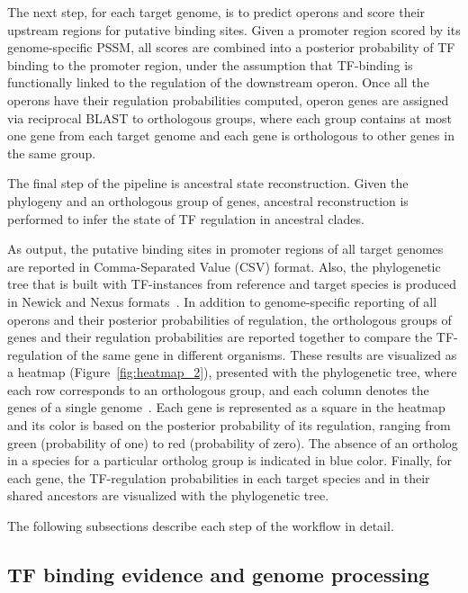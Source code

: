 The next step, for each target genome, is to predict operons and score their
upstream regions for putative binding sites. Given a promoter region scored by
its genome-specific PSSM, all scores are combined into a posterior probability
of TF binding to the promoter region, under the assumption that TF-binding is
functionally linked to the regulation of the downstream operon. Once all the
operons have their regulation probabilities computed, operon genes are assigned
via reciprocal BLAST to orthologous groups, where each group contains at most
one gene from each target genome and each gene is orthologous to other genes in
the same group.

The final step of the pipeline is ancestral state reconstruction. Given the
phylogeny and an orthologous group of genes,  ancestral reconstruction is
performed to infer the state of TF regulation in ancestral clades.

As output, the putative binding sites in promoter regions of all target genomes
are reported in Comma-Separated Value (CSV) format. Also, the phylogenetic tree
that is built with TF-instances from reference and target species is produced
in Newick and Nexus formats~\cite{maddison1997nexus,
  felsenstein2004inferring}. In addition to genome-specific reporting of all
operons and their posterior probabilities of regulation, the orthologous groups
of genes and their regulation probabilities are reported together to compare
the TF-regulation of the same gene in different organisms. These results are
visualized as a heatmap (Figure~\ref{fig:heatmap_2}), presented with the
phylogenetic tree, where each row corresponds to an orthologous group, and each
column denotes the genes of a single genome~\cite{huerta2016ete}. Each gene is
represented as a square in the heatmap and its color is based on the posterior
probability of its regulation, ranging from green (probability of one) to red
(probability of zero). The absence of an ortholog in a species for a particular
ortholog group is indicated in blue color. Finally, for each gene, the
TF-regulation probabilities in each target species and in their shared ancestors are
visualized with the phylogenetic tree.

The following subsections describe each step of the workflow in detail.

\subsection{TF binding evidence and genome processing}

